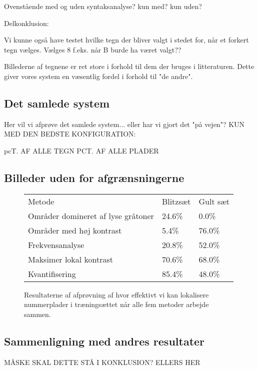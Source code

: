Ovenstående med og uden syntaksanalyse? kun med? kun uden?


Delkonklusion:

Vi kunne også have testet hvilke tegn der bliver valgt i stedet for, når et forkert tegn vælges. Vælges 8 f.eks. når B burde ha været valgt??

Billederne af tegnene er ret store i forhold til dem der bruges i litteraturen. Dette giver vores system en væsentlig fordel i forhold til "de andre".

\subsection{Det samlede system}

Her vil vi afprøve det samlede system... eller har vi gjort det "på vejen"?
KUN MED DEN BEDSTE KONFIGURATION:

pcT. AF ALLE TEGN
PCT. AF ALLE PLADER

\subsection{Billeder uden for afgrænsningerne}

\begin{figure}[htp]
\centering
\begin{tabular}{|l|l|l|}
\hline
\rowcolor[gray]{0.9} \multicolumn{3}{|>{\columncolor[gray]{0.9}}c|}{\textbf{..}} \\ \hline
Metode & Blitzsæt & Gult sæt\\ \hline
Områder domineret af lyse gråtoner &  24.6\% & 0.0\%\\ \hline
Områder med høj kontrast & 5.4\% & 76.0\%\\ \hline
Frekvensanalyse &  20.8\% & 52.0\%\\ \hline
Maksimer lokal kontrast &  70.6\% & 68.0\%\\ \hline
Kvantifisering &  85.4\% & 48.0\%\\
\hline
\end{tabular}
\caption{Resultaterne af afprøvning af hvor effektivt vi kan lokalisere nummerplader i træningsættet når alle fem metoder arbejde sammen.}
\label{fig:test:lokalisering_blitz_gul}
\end{figure}
\subsection{Sammenligning med andres resultater}

MÅSKE SKAL DETTE STÅ I KONKLUSION? ELLERS HER
